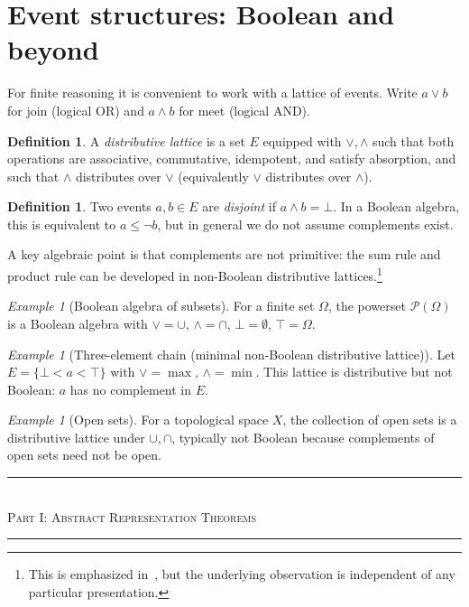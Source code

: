 \documentclass[11pt]{article}
\theoremstyle{definition}
\newtheorem{definition}[theorem]{Definition}
\theoremstyle{remark}
\newtheorem{example}[theorem]{Example}
\begin{document}
\section{Event structures: Boolean and beyond}

For finite reasoning it is convenient to work with a lattice of events.  Write $a\vee b$ for join
(logical OR) and $a\wedge b$ for meet (logical AND).

\begin{definition}
A \emph{distributive lattice} is a set $E$ equipped with $\vee,\wedge$ such that both operations are
associative, commutative, idempotent, and satisfy absorption, and such that $\wedge$ distributes over
$\vee$ (equivalently $\vee$ distributes over $\wedge$).
\end{definition}

\begin{definition}
Two events $a,b\in E$ are \emph{disjoint} if $a\wedge b=\bot$.  In a Boolean algebra, this is equivalent
to $a\le \neg b$, but in general we do not assume complements exist.
\end{definition}

A key algebraic point is that complements are not primitive: the sum rule and product rule can be
developed in non-Boolean distributive lattices.\footnote{This is emphasized in~\cite{KnuthSkilling2012}, but
the underlying observation is independent of any particular presentation.}

\begin{example}[Boolean algebra of subsets]
For a finite set $\Omega$, the powerset $\mathcal{P}(\Omega)$ is a Boolean algebra with
$\vee=\cup$, $\wedge=\cap$, $\bot=\emptyset$, $\top=\Omega$.
\end{example}

\begin{example}[Three-element chain (minimal non-Boolean distributive lattice)]
Let $E=\{\bot<a<\top\}$ with $\vee=\max$, $\wedge=\min$.  This lattice is distributive but not Boolean:
$a$ has no complement in $E$.
\end{example}

\begin{example}[Open sets]
For a topological space $X$, the collection of open sets is a distributive lattice under $\cup,\cap$,
typically not Boolean because complements of open sets need not be open.
\end{example}

\bigskip
\begin{center}
\rule{0.5\textwidth}{0.4pt}\\[0.5em]
\textsc{Part I: Abstract Representation Theorems}\\[0.3em]
\rule{0.5\textwidth}{0.4pt}
\end{center}
\bigskip
\end{document}
